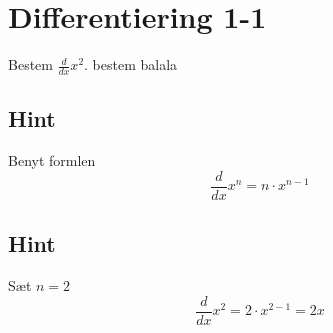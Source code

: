 \documentclass{article}
\newenvironment{exercise}[1]{\newpage\section{#1}}{}
\newcommand{\answerbox}[1]{\fbox{$#1$}}
\newcommand{\hint}{\subsection*{Hint}}
\begin{document}
\tableofcontents
\newpage

\begin{exercise}{Differentiering 1-1}

Bestem $\frac{d}{dx} x^2$.
bestem balala
\answerbox{2x}

\hint

Benyt formlen
\[
\frac{d}{dx} x^n = n \cdot x^{n - 1}
\]

\hint

Sæt $n = 2$
\[
\frac{d}{dx} x^2 = 2 \cdot x^{2 - 1} = 2 x
\]

\end{exercise}
\end{document}
